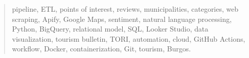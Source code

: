 \documentclass[a4paper,12pt,twoside]{memoir}
\begin{document}
\renewcommand*\abstractname{Keywords}
\begin{abstract}
pipeline, ETL, points of interest, reviews, municipalities, categories, web scraping, Apify, Google Maps, sentiment, natural language processing, Python, BigQuery, relational model, SQL, Looker Studio, data visualization, tourism bulletin, TORI, automation, cloud, GitHub Actions, workflow, Docker, containerization, Git, tourism, Burgos.
\end{abstract}

\clearpage

\tableofcontents

\clearpage

\listoffigures

\clearpage

\mainmatter











\end{document}
